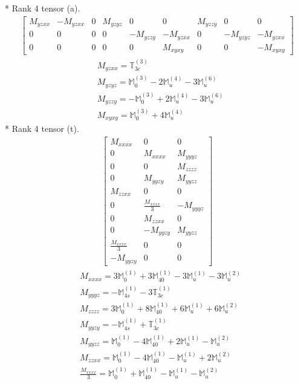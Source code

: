 \documentclass[fleqn,8pt,landscape]{jsarticle}
\begin{document}
* Rank 4 tensor (a).
\begin{align*}
\begin{bmatrix} M_{yzxx} & - M_{yzxx} & 0 & M_{yzyz} & 0 & 0 & M_{yzzy} & 0 & 0 \\ 0 & 0 & 0 & 0 & - M_{yzzy} & - M_{yzxx} & 0 & - M_{yzyz} & - M_{yzxx} \\ 0 & 0 & 0 & 0 & 0 & M_{xyxy} & 0 & 0 & - M_{xyxy} \end{bmatrix}
\end{align*}
\begin{align*}
& M_{yzxx} = \mathbb{T}_{3c}^{(3)} \\
& M_{yzyz} = \mathbb{M}_{0}^{(3)} - 2 \mathbb{M}_{u}^{(4)} - 3 \mathbb{M}_{u}^{(6)} \\
& M_{yzzy} = - \mathbb{M}_{0}^{(3)} + 2 \mathbb{M}_{u}^{(4)} - 3 \mathbb{M}_{u}^{(6)} \\
& M_{xyxy} = \mathbb{M}_{0}^{(3)} + 4 \mathbb{M}_{u}^{(4)}
\end{align*}
* Rank 4 tensor (t).
\begin{align*}
\begin{bmatrix} M_{xxxx} & 0 & 0 \\ 0 & M_{xxxx} & M_{yyyz} \\ 0 & 0 & M_{zzzz} \\ 0 & M_{yyzy} & M_{yyzz} \\ M_{zzxx} & 0 & 0 \\ 0 & \frac{M_{xxxx}}{3} & - M_{yyyz} \\ 0 & M_{zzxx} & 0 \\ 0 & - M_{yyzy} & M_{yyzz} \\ \frac{M_{xxxx}}{3} & 0 & 0 \\ - M_{yyzy} & 0 & 0 \end{bmatrix}
\end{align*}
\begin{align*}
& M_{xxxx} = 3 \mathbb{M}_{0}^{(1)} + 3 \mathbb{M}_{40}^{(1)} - 3 \mathbb{M}_{u}^{(1)} - 3 \mathbb{M}_{u}^{(2)} \\
& M_{yyyz} = - \mathbb{M}_{4s}^{(1)} - 3 \mathbb{T}_{3c}^{(1)} \\
& M_{zzzz} = 3 \mathbb{M}_{0}^{(1)} + 8 \mathbb{M}_{40}^{(1)} + 6 \mathbb{M}_{u}^{(1)} + 6 \mathbb{M}_{u}^{(2)} \\
& M_{yyzy} = - \mathbb{M}_{4s}^{(1)} + \mathbb{T}_{3c}^{(1)} \\
& M_{yyzz} = \mathbb{M}_{0}^{(1)} - 4 \mathbb{M}_{40}^{(1)} + 2 \mathbb{M}_{u}^{(1)} - \mathbb{M}_{u}^{(2)} \\
& M_{zzxx} = \mathbb{M}_{0}^{(1)} - 4 \mathbb{M}_{40}^{(1)} - \mathbb{M}_{u}^{(1)} + 2 \mathbb{M}_{u}^{(2)} \\
& \frac{M_{xxxx}}{3} = \mathbb{M}_{0}^{(1)} + \mathbb{M}_{40}^{(1)} - \mathbb{M}_{u}^{(1)} - \mathbb{M}_{u}^{(2)}
\end{align*}
\end{document}
